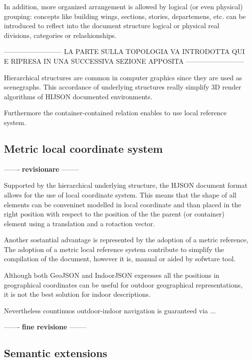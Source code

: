 \documentclass{sig-alternate}
\begin{document}
In addition, more organized arrangement is allowed by logical (or even physical) 
grouping: concepts like building wings, sections, stories, departemens, etc. can be 
introduced to reflect into the document structure logical or physical real divisions, 
categories or relashionships.

--------------------------
LA PARTE SULLA TOPOLOGIA VA INTRODOTTA QUI E RIPRESA IN UNA SUCCESSIVA SEZIONE APPOSITA
--------------------------

Hierarchical structures are common in computer graphics since they are used as 
scenegraphs. This accordance of underlying structures really simplify 3D render 
algorithms of HIJSON documented environments.

Furthermore the container-contained relation enables to use local reference system.

\subsection{Metric local coordinate system}\label{metric-local-coordinate-system}


------- \textbf{revisionare} --------

Supported by the hierarchical underlying structure, the HJSON document format allows 
for the use of local coordinate system. This means that the shape of all elements can 
be conveninet modelled in local coordinate and than placed in the right position 
with respect to the position of the the parent (or container) element using a 
translation and a rotaction vector.

Another sostantial advantage is represented by the adoption of a metric reference, 
The adoption of a metric local reference system contribute to simplify the compilation 
of the document, however it is, manual or aided by sofwtare tool.


Although both GeoJSON and IndoorJSON expresses all the positions in geographical 
coordinates can be useful for outdoor geographical
representations, it is not the best solution for indoor descriptions.

Nevertheless countinuos outdoor-indoor navigation is guaranteed via ...

------- \textbf{fine revisione} --------


\subsection{Semantic extensions}\label{semantic-extensions}
\end{document}
